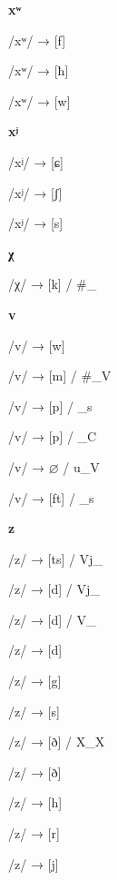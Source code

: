 \begin{center}\textbf{xʷ}\end{center}
\begin{multicols}{4}
\noindent /xʷ/ → [f]

\noindent /xʷ/ → [ħ]

\noindent /xʷ/ → [w]
\end{multicols}


\begin{center}\textbf{xʲ}\end{center}
\begin{multicols}{4}
\noindent /xʲ/ → [ɕ]

\noindent /xʲ/ → [ʃ]

\noindent /xʲ/ → [s]
\end{multicols}


\begin{center}\textbf{χ}\end{center}
\begin{multicols}{4}
\noindent /χ/ → [k] / \#\_
\end{multicols}


\begin{center}\textbf{v}\end{center}
\begin{multicols}{4}
\noindent /v/ → [w]

\noindent /v/ → [m] / \#\_V

\noindent /v/ → [p] / \_s

\noindent /v/ → [p] / \_C

\noindent /v/ → $\varnothing$ / u\_V

\noindent /v/ → [ft] / \_s

\end{multicols}

\begin{center}\textbf{z}\end{center}
\begin{multicols}{4}
\noindent /z/ → [ts] / Vj\_

\noindent /z/ → [d] / Vj\_

\noindent /z/ → [d] / V\_

\noindent /z/ → [d]

\noindent /z/ → [g]

\noindent /z/ → [s]

\noindent /z/ → [ð] / X\_X

\noindent /z/ → [ð]

\noindent /z/ → [h]

\noindent /z/ → [r]

\noindent /z/ → [j]
\end{multicols}


